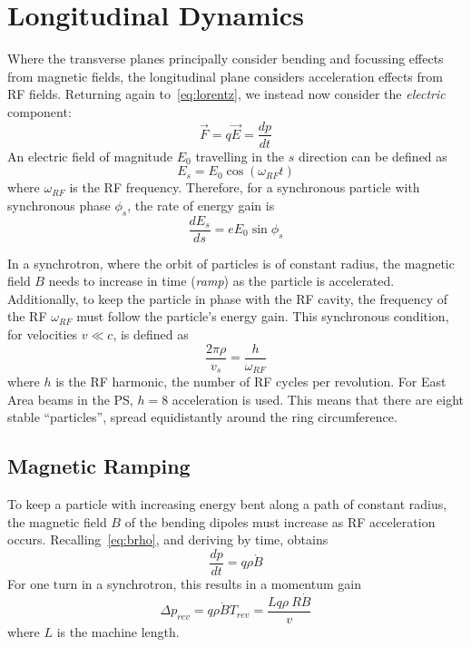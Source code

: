 \documentclass[11pt]{report}
\begin{document}
\section{Longitudinal Dynamics}

Where the transverse planes principally consider bending and focussing effects from magnetic fields, the longitudinal plane considers acceleration effects from RF fields. Returning again to~\autoref{eq:lorentz}, we instead now consider the \textit{electric} component:
\begin{equation}
  \vec F = q\vec E = \frac{dp}{dt}
\end{equation} 
An electric field of magnitude $E_0$ travelling in the $s$ direction can be defined as
\begin{equation}
  E_s = E_0\cos(\omega_{RF}t)
\end{equation} where $\omega_{RF}$ is the RF frequency. Therefore, for a synchronous particle with synchronous phase $\phi_s$, the rate of energy gain is
\begin{equation}
  \frac{dE_s}{ds}=eE_0\sin\phi_s
\end{equation}

In a synchrotron, where the orbit of particles is of constant radius, the magnetic field $B$ needs to increase in time (\textit{ramp}) as the particle is accelerated. Additionally, to keep the particle in phase with the RF cavity, the frequency of the RF $\omega_{RF}$ must follow the particle's energy gain. This synchronous condition, for velocities $v\ll c$, is defined as
\begin{equation}
  \frac{2\pi\rho}{v_s}=\frac h{\omega_{RF}}
\end{equation} where $h$ is the RF harmonic, the number of RF cycles per revolution. For East Area beams in the PS, $h=8$ acceleration is used. This means that there are eight stable ``particles'', spread equidistantly around the ring circumference. 


\subsection{Magnetic Ramping}

To keep a particle with increasing energy bent along a path of constant radius, the magnetic field $B$ of the bending dipoles must increase as RF acceleration occurs. Recalling~\autoref{eq:brho}, and deriving by time, obtains
\begin{equation}
  \frac{dp}{dt} = q\rho\dot B
\end{equation}
For one turn in a synchrotron, this results in a momentum gain
\begin{equation}
  \Delta p_{rev} = q\rho\dot B T_{rev}=\frac{Lq\rho~R\dot B}v
\end{equation} where $L$ is the machine length. 
\end{document}
